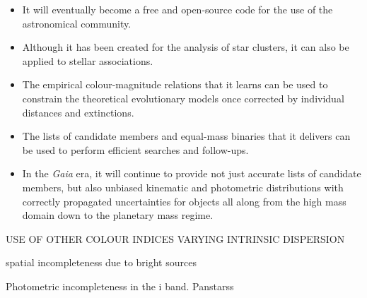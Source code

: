 \begin{itemize}
\item It will eventually become a free and open-source code for the use of the astronomical community.
\item Although it has been created for the analysis of star clusters, it can also be applied to stellar associations.
\item The empirical colour-magnitude relations that it learns can be used to constrain the theoretical evolutionary models once corrected by individual distances and extinctions.
\item The lists of candidate members and equal-mass binaries that it delivers can be used to perform efficient searches and follow-ups.
\item In the \emph{Gaia} era, it will continue to provide not just accurate lists of candidate members, but also unbiased kinematic and photometric distributions with correctly propagated uncertainties for objects all along from the high mass domain down to the planetary mass regime.
\end{itemize}

USE OF OTHER COLOUR INDICES
VARYING INTRINSIC DISPERSION

spatial incompleteness due to bright sources

Photometric incompleteness in the i band. Panstarss






